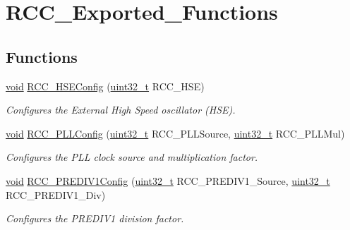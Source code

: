 \hypertarget{group___r_c_c___exported___functions}{\section{R\-C\-C\-\_\-\-Exported\-\_\-\-Functions}
\label{group___r_c_c___exported___functions}
}
\subsection*{Functions}
\begin{DoxyCompactItemize}
\item 
\hyperlink{group___n_a_m_e_ga18028b8badbf1ea7e704ccac3c488e82}{void} \hyperlink{group___r_c_c___exported___functions_ga432b3281546d23345642d55f8670a93d}{R\-C\-C\-\_\-\-H\-S\-E\-Config} (\hyperlink{stdint_8h_a435d1572bf3f880d55459d9805097f62}{uint32\-\_\-t} R\-C\-C\-\_\-\-H\-S\-E)
\begin{DoxyCompactList}\small\item\em Configures the External High Speed oscillator (H\-S\-E). \end{DoxyCompactList}\item 
\hyperlink{group___n_a_m_e_ga18028b8badbf1ea7e704ccac3c488e82}{void} \hyperlink{group___r_c_c___exported___functions_ga0f67634cbe721f2c42f022d2a93229c8}{R\-C\-C\-\_\-\-P\-L\-L\-Config} (\hyperlink{stdint_8h_a435d1572bf3f880d55459d9805097f62}{uint32\-\_\-t} R\-C\-C\-\_\-\-P\-L\-L\-Source, \hyperlink{stdint_8h_a435d1572bf3f880d55459d9805097f62}{uint32\-\_\-t} R\-C\-C\-\_\-\-P\-L\-L\-Mul)
\begin{DoxyCompactList}\small\item\em Configures the P\-L\-L clock source and multiplication factor. \end{DoxyCompactList}\item 
\hyperlink{group___n_a_m_e_ga18028b8badbf1ea7e704ccac3c488e82}{void} \hyperlink{group___r_c_c___exported___functions_gacd3c01d1510b7b249b38a0aff66e4190}{R\-C\-C\-\_\-\-P\-R\-E\-D\-I\-V1\-Config} (\hyperlink{stdint_8h_a435d1572bf3f880d55459d9805097f62}{uint32\-\_\-t} R\-C\-C\-\_\-\-P\-R\-E\-D\-I\-V1\-\_\-\-Source, \hyperlink{stdint_8h_a435d1572bf3f880d55459d9805097f62}{uint32\-\_\-t} R\-C\-C\-\_\-\-P\-R\-E\-D\-I\-V1\-\_\-\-Div)
\begin{DoxyCompactList}\small\item\em Configures the P\-R\-E\-D\-I\-V1 division factor. \end{DoxyCompactList}\item 

\end{DoxyCompactItemize}
